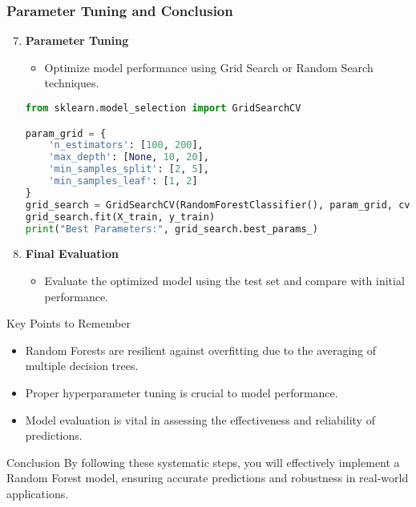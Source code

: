 \documentclass[aspectratio=169]{beamer}
\begin{document}
\begin{frame}[fragile]
    \frametitle{Parameter Tuning and Conclusion}
    \begin{enumerate}
        \setcounter{enumi}{6}
        \item \textbf{Parameter Tuning}
            \begin{itemize}
                \item Optimize model performance using Grid Search or Random Search techniques.
            \end{itemize}
            \begin{lstlisting}[language=Python]
from sklearn.model_selection import GridSearchCV

param_grid = {
    'n_estimators': [100, 200],
    'max_depth': [None, 10, 20],
    'min_samples_split': [2, 5],
    'min_samples_leaf': [1, 2]
}
grid_search = GridSearchCV(RandomForestClassifier(), param_grid, cv=3)
grid_search.fit(X_train, y_train)
print("Best Parameters:", grid_search.best_params_)
            \end{lstlisting}

        \item \textbf{Final Evaluation}
            \begin{itemize}
                \item Evaluate the optimized model using the test set and compare with initial performance.
            \end{itemize}
    \end{enumerate}

    \begin{block}{Key Points to Remember}
        \begin{itemize}
            \item Random Forests are resilient against overfitting due to the averaging of multiple decision trees.
            \item Proper hyperparameter tuning is crucial to model performance.
            \item Model evaluation is vital in assessing the effectiveness and reliability of predictions.
        \end{itemize}
    \end{block}

    \begin{block}{Conclusion}
        By following these systematic steps, you will effectively implement a Random Forest model, ensuring accurate predictions and robustness in real-world applications.
    \end{block}
\end{frame}
\end{document}
